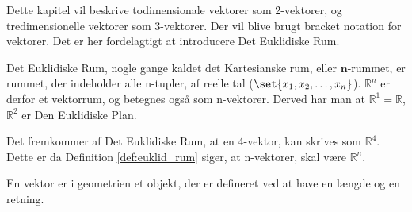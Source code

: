 Dette kapitel vil beskrive todimensionale vektorer som 2-vektorer, og tredimensionelle vektorer som 3-vektorer.
Der vil blive brugt bracket notation for vektorer.
Det er her fordelagtigt at introducere Det Euklidiske Rum.
\begin{frdef}\label{def:euklid_rum}
	Det Euklidiske Rum, nogle gange kaldet det Kartesianske rum, eller $\mathbf{n}$-rummet, er rummet, der indeholder alle n-tupler, af reelle tal ($\set{x_1,x_2,\dots,x_n}$).
$\mathbb{R}^n$ er derfor et vektorrum, og betegnes også som n-vektorer.
Derved har man at $\mathbb{R}^1=\mathbb{R}$, $\mathbb{R}^2$ er Den Euklidiske Plan.
\end{frdef}

Det fremkommer af Det Euklidiske Rum, at en 4-vektor, kan skrives som $\mathbb{R}^4$.
Dette er da Definition \ref{def:euklid_rum} siger, at n-vektorer, skal være $\mathbb{R}^n$.

\begin{frdef}[Vektorer]
	En vektor er i geometrien et objekt, der er defineret ved at have en længde og en retning.
\end{frdef}




